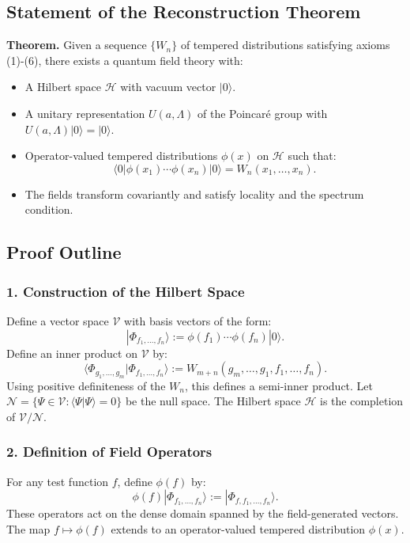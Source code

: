 \documentclass{article}
\newcommand{\1}{\mathbbm{1}}
\theoremstyle{plain}
\theoremstyle{definition}
\numberwithin{equation}{section}
\begin{document}
\subsection{Statement of the Reconstruction Theorem}

\textbf{Theorem.} Given a sequence $\{ W_n \}$ of tempered distributions satisfying axioms (1)-(6), there exists a quantum field theory with:

\begin{itemize}
  \item A Hilbert space $\mathcal{H}$ with vacuum vector $|0\rangle$.
  \item A unitary representation $U(a, \Lambda)$ of the Poincaré group with $U(a, \Lambda)|0\rangle = |0\rangle$.
  \item Operator-valued tempered distributions $\phi(x)$ on $\mathcal{H}$ such that:
  \[
  \langle 0 | \phi(x_1) \cdots \phi(x_n) | 0 \rangle = W_n(x_1, \dots, x_n).
  \]
  \item The fields transform covariantly and satisfy locality and the spectrum condition.
\end{itemize}

\subsection{Proof Outline}

\subsubsection{1. Construction of the Hilbert Space}

Define a vector space $\mathscr{V}$ with basis vectors of the form:
\[
|\Phi_{f_1, \dots, f_n} \rangle := \phi(f_1) \cdots \phi(f_n) |0\rangle.
\]
Define an inner product on $\mathscr{V}$ by:
\[
\langle \Phi_{g_1, \dots, g_m} | \Phi_{f_1, \dots, f_n} \rangle := W_{m+n}(g_m, \dots, g_1, f_1, \dots, f_n).
\]
Using positive definiteness of the $W_n$, this defines a semi-inner product. Let $\mathscr{N} = \{ \Psi \in \mathscr{V} : \langle \Psi | \Psi \rangle = 0 \}$ be the null space. The Hilbert space $\mathcal{H}$ is the completion of $\mathscr{V}/\mathscr{N}$.

\subsubsection{2. Definition of Field Operators}

For any test function $f$, define $\phi(f)$ by:
\[
\phi(f) |\Phi_{f_1, \dots, f_n}\rangle := |\Phi_{f, f_1, \dots, f_n}\rangle.
\]
These operators act on the dense domain spanned by the field-generated vectors. The map $f \mapsto \phi(f)$ extends to an operator-valued tempered distribution $\phi(x)$.
\end{document}
